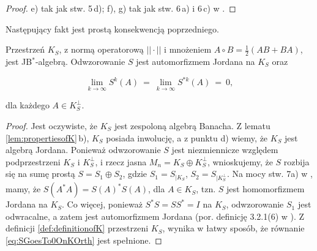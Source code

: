 {\begin{proof}
e) tak jak stw. 5\,d);
f), g) tak jak stw. 6\,a) i 6\,c) w
\cite{olkiewicz1999environment}.
\end{proof}

Następujący fakt jest prostą konsekwencją poprzedniego.

\begin{Corollary}
\label{cor:KisJordanAlgebra}
Przestrzeń $K_{S}$,
z normą operatorową $|| \cdot ||$
i mnożeniem $A \circ B = \frac{1}{2}(AB + BA)$,
jest JB$^{*}$-algebrą.
Odwzorowanie $S$ jest automorfizmem Jordana na $K_{S}$ oraz
\begin{linenomath*}
 \begin{equation}
\label{eq:SGoesTo0OnKOrth}
    \lim \limits_{k\rightarrow \infty} S^{k}(A)  \: = \:
    \lim \limits_{k\rightarrow \infty} S^{*k}(A) \: = \: 0,
 \end{equation}
\end{linenomath*}
dla każdego $A \in K_{S}^{\perp}$.
\end{Corollary}

\begin{proof}
Jest oczywiste, że $K_{S}$ jest zespoloną algebrą Banacha.
Z lematu \ref{lem:propertiesofK}\,b),
$K_{S}$ posiada inwolucję,
a z punktu d) wiemy, że $K_{S}$ jest algebrą Jordana.
Ponieważ odwzorowanie $S$ jest niezmiennicze względem podprzestrzeni
$K_{S}$ i $K_{S}^{\perp}$,
i rzecz jasna $M_{n} = K_{S} \oplus K_{S}^{\perp}$,
wnioskujemy, że $S$ rozbija się na sumę prostą
$S = S_{1} \oplus S_{2}$,
gdzie $S_{1} = S_{| K_{S}}$, $S_{2} = S_{| K_{S}^{\perp}}$.
Na mocy stw. 7a) w \cite{olkiewicz1999environment},
mamy, że $S(A^{*} A) = S(A)^{*} S(A)$, dla $A \in K_{S}$,
tzn. $S$ jest homomorfizmem Jordana na $K_{S}$.
Co więcej, ponieważ $S^{*} S = S S^{*} = I$ na $K_{S}$,
odwzorowanie $S_{1}$ jest odwracalne,
a zatem jest automorfizmem Jordana
(por. definicję 3.2.1(6) w \cite{Bratteli2003}).
Z definicji \eqref{def:definitionofK} przestrzeni $K_{S}$,
wynika w łatwy sposób, że
równanie \eqref{eq:SGoesTo0OnKOrth} jest spełnione.
\end{proof}

}
